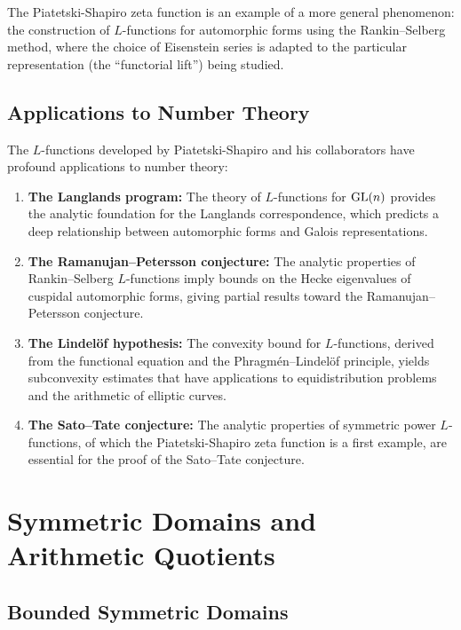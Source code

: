 The Piatetski-Shapiro zeta function is an example of a more general phenomenon: the construction of \(L\)-functions for automorphic forms using the Rankin--Selberg method, where the choice of Eisenstein series is adapted to the particular representation (the ``functorial lift'') being studied.

\subsection{Applications to Number Theory}

The \(L\)-functions developed by Piatetski-Shapiro and his collaborators have profound applications to number theory:

\begin{enumerate}
    \item \textbf{The Langlands program:} The theory of \(L\)-functions for \(\operatorname{GL}(n)\) provides the analytic foundation for the Langlands correspondence, which predicts a deep relationship between automorphic forms and Galois representations.

    \item \textbf{The Ramanujan--Petersson conjecture:} The analytic properties of Rankin--Selberg \(L\)-functions imply bounds on the Hecke eigenvalues of cuspidal automorphic forms, giving partial results toward the Ramanujan--Petersson conjecture.

    \item \textbf{The Lindel\"{o}f hypothesis:} The convexity bound for \(L\)-functions, derived from the functional equation and the Phragm\'{e}n--Lindel\"{o}f principle, yields subconvexity estimates that have applications to equidistribution problems and the arithmetic of elliptic curves.

    \item \textbf{The Sato--Tate conjecture:} The analytic properties of symmetric power \(L\)-functions, of which the Piatetski-Shapiro zeta function is a first example, are essential for the proof of the Sato--Tate conjecture.
\end{enumerate}

\section{Symmetric Domains and Arithmetic Quotients}

\subsection{Bounded Symmetric Domains}

